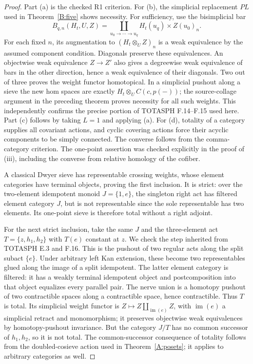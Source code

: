 \documentclass[11pt,a4paper]{article}
\theoremstyle{definition}
\theoremstyle{remark}
\newcommand{\im}{\operatorname{im}}
\begin{document}
\begin{proof}
Part (a) is the checked R1 criterion. For (b), the simplicial replacement $PL$ used in Theorem~\ref{B:five} shows necessity. For sufficiency, use the bisimplicial bar
\[
 B_{q,n}(H_t,U,Z)=\coprod_{u_0\to\cdots\to u_q}H_t(u_q)\times Z(u_0)_n.
\]
For each fixed $n$, its augmentation to $(H_t\otimes_U Z)_n$ is a weak equivalence by the assumed component condition. Diagonals preserve these equivalences. An objectwise weak equivalence $Z\to Z'$ also gives a degreewise weak equivalence of bars in the other direction, hence a weak equivalence of their diagonals. Two out of three proves the weight functor homotopical. In a simplicial pushout along a sieve the new hom spaces are exactly $H_t\otimes_U C(c,p(-))$; the source-collage argument in the preceding theorem proves necessity for all such weights. This independently confirms the precise portion of TOTASPH F.14--F.15 used here. Part (c) follows by taking $L=1$ and applying (a). For (d), totality of a category supplies all covariant actions, and cyclic covering actions force their acyclic components to be simply connected. The converse follows from the comma-category criterion. The one-point assertion was checked explicitly in the proof of (iii), including the converse from relative homology of the cofiber.

A classical Dwyer sieve has representable crossing weights, whose element categories have terminal objects, proving the first inclusion. It is strict: over the two-element idempotent monoid $J=\{1,e\}$, the singleton right act has filtered element category $J$, but is not representable since the sole representable has two elements. Its one-point sieve is therefore total without a right adjoint.

For the next strict inclusion, take the same $J$ and the three-element act $T=\{z,h_1,h_2\}$ with $T(e)$ constant at $z$. We check the step inherited from TOTASPH E.3 and F.16. This is the pushout of two regular acts along the split subact $\{e\}$. Under arbitrary left Kan extension, these become two representables glued along the image of a split idempotent. The latter element category is filtered: it has a weakly terminal idempotent object and postcomposition into that object equalizes every parallel pair. The nerve union is a homotopy pushout of two contractible spaces along a contractible space, hence contractible. Thus $T$ is total. Its simplicial weight functor is $Z\mapsto Z\amalg_{\im(e)}Z$, with $\im(e)$ a simplicial retract and monomorphism; it preserves objectwise weak equivalences by homotopy-pushout invariance. But the category $J/T$ has no common successor of $h_1,h_2$, so it is not total. The common-successor consequence of totality follows from the doubled-cosieve action used in Theorem~\ref{A:posets}; it applies to arbitrary categories as well.


\end{proof}
\end{document}
